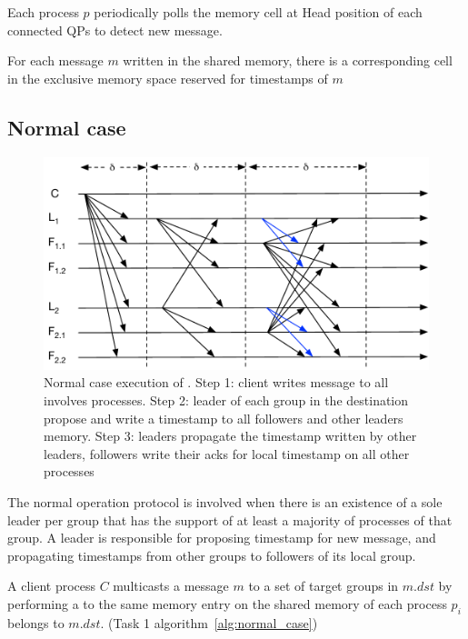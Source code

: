 Each process $p$ periodically polls the memory cell at Head position of each
connected QPs to detect new message.

For each message $m$ written in the shared memory, there is a corresponding cell
in the exclusive memory space reserved for timestamps of $m$

\subsection{Normal case}

\begin{figure}[ht!]
  \centering
  \includegraphics[width=1\linewidth]{figures/timeline-simple}
  \caption{Normal case execution of \proto. Step 1: client writes message to all
          involves processes. Step 2: leader of each group in the destination
          propose and write a timestamp to all followers and other leaders
          memory. Step 3: leaders propagate the timestamp written by other
          leaders, followers write their acks for local timestamp on all other
          processes}
  \label{fig:normal_operation_time}
\end{figure}



The normal operation protocol is involved when there is an existence of a sole
leader per group that has the support of at least a majority of processes of
that group. A leader is responsible for proposing timestamp for new message, and
propagating timestamps from other groups to followers of its local group.

A client process $C$ multicasts a message $m$ to a set of target groups in
$m.dst$ by performing a \rwrite to the same memory entry on the shared memory of
each process $p_i$ belongs to $m.dst$. (Task 1 algorithm~\ref{alg:normal_case})


